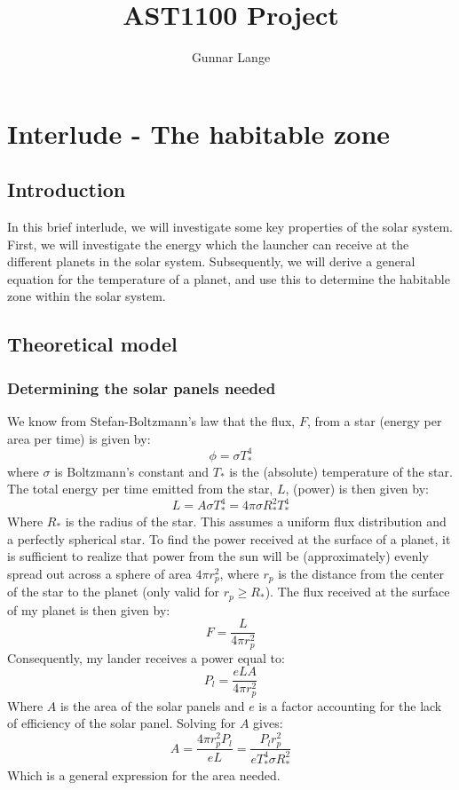 \documentclass[a4paper,10pt,english]{article}
\title{AST1100 Project}
\author{Gunnar Lange}
\begin{document}
\maketitle
\section*{Interlude - The habitable zone}
\subsection*{Introduction}
In this brief interlude, we will investigate some key properties of the solar system. First, we will investigate the energy which the launcher can receive at the different planets in the solar system. Subsequently, we will derive a general equation for the temperature of a planet, and use this to determine the habitable zone within the solar system.
\subsection*{Theoretical model}
\subsubsection*{Determining the solar panels needed}
We know from Stefan-Boltzmann's law that the flux, $F$, from a star (energy per area per time) is given by:
$$\phi = \sigma T_*^4$$
where $\sigma$ is Boltzmann's constant and  $T_*$ is the (absolute) temperature of the star. The total energy per time emitted from the star, $L$, (power) is then given by:
$$L=A\sigma T_*^4 = 4\pi \sigma R_*^2 T_*^4$$
Where $R_*$ is the radius of the star. This assumes a uniform flux distribution and a perfectly spherical star. To find the power received at the surface of a planet, it is sufficient to realize that power from the sun will be (approximately) evenly spread out across a sphere of area $4\pi r_p^2$, where $r_p$ is the distance from the center of the star to the planet (only valid for $r_p\geq R_*$). The flux received at the surface of my planet is then given by:
$$F=\frac{L}{4\pi r_p^2 }$$
Consequently, my lander receives a power equal to:
$$P_l=\frac{eLA}{4\pi r_p^2}$$
Where $A$ is the area of the solar panels and $e$ is a factor accounting for the lack of efficiency of the solar panel. Solving for $A$ gives:
$$A=\frac{4\pi r_p^2P_l}{eL}=\frac{P_lr_p^2}{e T_*^4\sigma R_*^2}$$
Which is a general expression for the area needed. 
\end{document}
